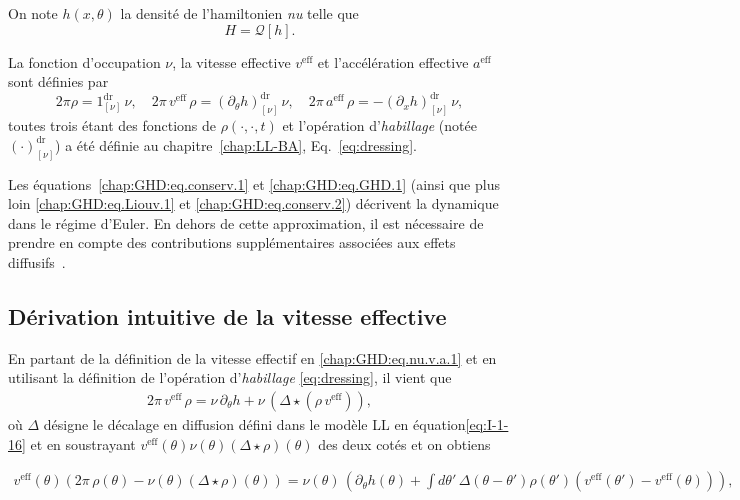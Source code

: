 \medskip


On note $h(x,\theta)$ la densité de l'hamiltonien \emph{nu} telle que
\begin{equation}\label{chap:GHD:eq.ham.1}
	H = \mathcal{Q}[h].
\end{equation}

La fonction d’occupation $\nu$, la vitesse effective $v^{\mathrm{eff}}$ et l’accélération effective $a^{\mathrm{eff}}$ sont définies par
\begin{equation}\label{chap:GHD:eq.nu.v.a.1}
	2 \pi \rho =  1^{\mathrm{dr}}_{[\nu]} \, \nu , 
	\quad 2 \pi \, v^{\mathrm{eff}} \, \rho  =(\partial_\theta h )^{\mathrm{dr}}_{[\nu]} \, \nu , 
	\quad 2 \pi \, a^{\mathrm{eff}} \, \rho  = -(\partial_x h )^{\mathrm{dr}}_{[\nu]}\, \nu ,
\end{equation}
toutes trois étant des fonctions de $\rho(\cdot,\cdot,t)$ et l’opération d’\emph{habillage} (notée $(\cdot)^{\mathrm{dr}}_{[\nu]}$) a été définie au chapitre~\ref{chap:LL-BA}, Eq.~\eqref{eq:dressing}.

\medskip

Les équations~\eqref{chap:GHD:eq.conserv.1} et \eqref{chap:GHD:eq.GHD.1} (ainsi que plus loin \eqref{chap:GHD:eq.Liouv.1} et \eqref{chap:GHD:eq.conserv.2}) décrivent la dynamique dans le régime d’Euler. En dehors de cette approximation, il est nécessaire de prendre en compte des contributions supplémentaires associées aux effets diffusifs~\cite{DeNardis2018}.

\subsection{Dérivation intuitive de la vitesse effective}

En partant de la définition de la vitesse effectif en \eqref{chap:GHD:eq.nu.v.a.1} et en utilisant la définition de l’opération d’\emph{habillage} \eqref{eq:dressing}, il vient que 
\begin{eqnarray}\label{chap:GHD:veff.1}
	2 \pi \, v^{\mathrm{eff}} \,   \rho   = \nu  \,  \partial_\theta h   + \nu  \,  \left ( \Delta \star ( \rho \,  v^{\mathrm{eff}} )  \right ) ,
\end{eqnarray}
où $\Delta$ désigne le décalage en diffusion défini dans le modèle \gls{LL} en équation\eqref{eq:I-1-16}
et en soustrayant $v^{\mathrm{eff}} ( \theta ) \nu (\theta) \left ( \Delta \star  \rho  \right )( \theta )$ des deux cotés et on obtiens 

\begin{eqnarray}\label{chap:GHD:veff.2}
	v^{\mathrm{eff}} ( \theta )  \left (  2\pi \, \rho ( \theta ) - \nu (\theta) \left ( \Delta \star  \rho  \right )( \theta ) \right )    = \nu( \theta )  \,  \left (  \partial_\theta h ( \theta )  +  \int d \theta' \, \Delta(\theta - \theta') \rho ( \theta') ( v^{\mathrm{eff}} ( \theta' ) - v^{\mathrm{eff}} ( \theta )  )   \right )  ,
\end{eqnarray}

